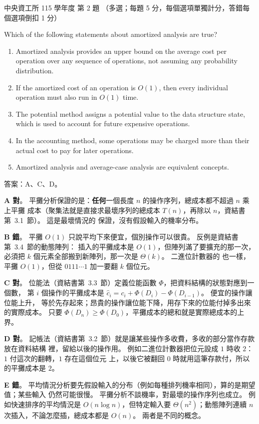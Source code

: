 \begin{pastexam}[label={px:ncu-115-dsa-02}]{中央資工所 115 學年度 第 2 題}
（多選；每題 5 分，每個選項單獨計分，答錯每個選項倒扣 1 分）

Which of the following statements about amortized analysis are true?
\begin{enumerate}[label=\Alph*.]
\item Amortized analysis provides an upper bound on the average cost per operation over any sequence of operations, not assuming any probability distribution.
\item If the amortized cost of an operation is $O(1)$, then every individual operation must also run in $O(1)$ time.
\item The potential method assigns a potential value to the data structure state, which is used to account for future expensive operations.
\item In the accounting method, some operations may be charged more than their actual cost to pay for later operations.
\item Amortized analysis and average-case analysis are equivalent concepts.
\end{enumerate}
\end{pastexam}

\begin{pastsoln}
答案：A、C、D。

\textbf{A 對}。 平攤分析保證的是：\textbf{任何}一個長度 $n$ 的操作序列，總成本都不超過 $n$ 乘上平攤
成本（聚集法就是直接求最壞序列的總成本 $T(n)$，再除以 $n$，資結書第~3.1~節）。 這是最壞情況的
保證，沒有假設輸入的機率分布。

\textbf{B 錯}。 平攤 $O(1)$ 只說平均下來便宜，個別操作可以很貴。 反例是資結書第~3.4~節的動態陣列：
插入的平攤成本是 $O(1)$，但陣列滿了要擴充的那一次，必須把 $k$ 個元素全部搬到新陣列，那一次是
$\Theta(k)$。 二進位計數器的  也一樣，平攤 $O(1)$，但從 $0111\cdots1$ 加一要翻
$k$ 個位元。

\textbf{C 對}。 位能法（資結書第~3.3~節）定義位能函數 $\Phi$，把資料結構的狀態對應到一個數，
第 $i$ 個操作的平攤成本是 $\hat c_i = c_i + \Phi(D_i) - \Phi(D_{i-1})$。 便宜的操作讓位能上升，
等於先存起來；昂貴的操作讓位能下降，用存下來的位能付掉多出來的實際成本。 只要
$\Phi(D_n) \ge \Phi(D_0)$，平攤成本的總和就是實際總成本的上界。

\textbf{D 對}。 記帳法（資結書第~3.2~節）就是讓某些操作多收費，多收的部分當作存款放在資料結構
裡，留給以後的操作用。 例如二進位計數器把位元設成 $1$ 時收 $2$：$1$ 付這次的翻轉，$1$ 存在這個位元
上，以後它被翻回 $0$ 時就用這筆存款付，所以  的平攤成本是 $2$。

\textbf{E 錯}。 平均情況分析要先假設輸入的分布（例如每種排列機率相同），算的是期望值；某些輸入
仍然可能很慢。 平攤分析不談機率，對最壞的操作序列也成立。 例如快速排序的平均情況是
$O(n \log n)$，但特定輸入要 $\Theta(n^2)$；動態陣列連續 $n$ 次插入，不論怎麼插，總成本都是
$O(n)$。 兩者是不同的概念。
\end{pastsoln}

